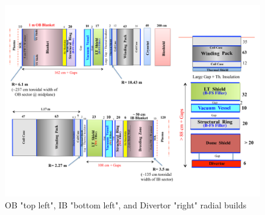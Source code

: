\documentclass[12pt, letterpaper]{elsarticle}
\begin{document}
\begin{figure}[h!]
  \centering
  \includegraphics[scale=0.4]{../plots/radial_build.png}
  \caption{OB "top left", IB "bottom left", and Divertor "right" radial builds}
  \label{fig:radial build}
\end{figure}
\end{document}
